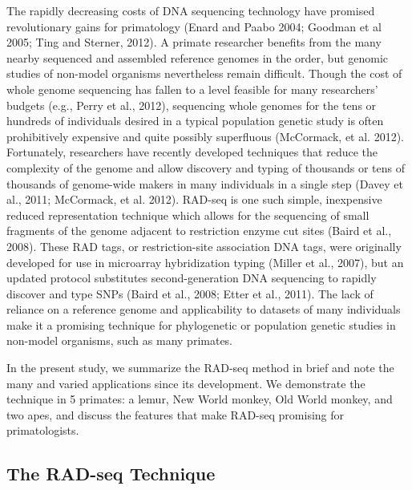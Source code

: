 \documentclass[12pt]{article}
\begin{document}
The rapidly decreasing costs of DNA sequencing technology have promised revolutionary gains for primatology (Enard and Paabo 2004; Goodman et al 2005; Ting and Sterner, 2012). A primate researcher benefits from the many nearby sequenced and assembled reference genomes in the order, but genomic studies of non-model organisms nevertheless remain difficult. Though the cost of whole genome sequencing has fallen to a level feasible for many researchers' budgets (e.g., Perry et al., 2012), sequencing whole genomes for the tens or hundreds of individuals desired in a typical population genetic study is often prohibitively expensive and quite possibly superfluous (McCormack, et al. 2012). Fortunately, researchers have recently developed techniques that reduce the complexity of the genome and allow discovery and typing of thousands or tens of thousands of genome-wide makers in many individuals in a single step (Davey et al., 2011; McCormack, et al. 2012). RAD-seq is one such simple, inexpensive reduced representation technique which allows for the sequencing of small fragments of the genome adjacent to restriction enzyme cut sites (Baird et al., 2008). These RAD tags, or restriction-site association DNA tags, were originally developed for use in microarray hybridization typing (Miller et al., 2007), but an updated protocol substitutes second-generation DNA sequencing to rapidly discover and type SNPs (Baird et al., 2008; Etter et al., 2011). The lack of reliance on a reference genome and applicability to datasets of many individuals make it a promising technique for phylogenetic or population genetic studies in non-model organisms, such as many primates.

In the present study, we summarize the RAD-seq method in brief and note the many and varied applications since its development. We demonstrate the technique in 5 primates: a lemur, New World monkey, Old World monkey, and two apes, and discuss the features that make RAD-seq promising for primatologists.  

\subsection{The RAD-seq Technique}
\end{document}
